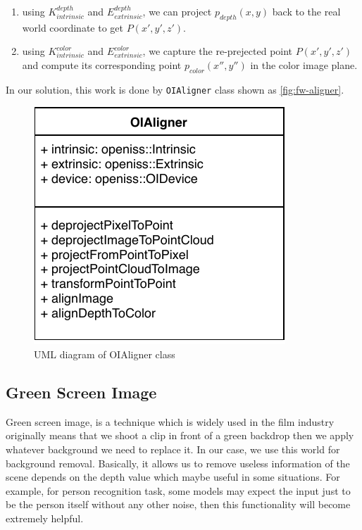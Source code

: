 \begin{enumerate}
    \item using $K_{intrinsic}^{depth}$ and $E_{extrinsic}^{depth}$, we can
    project $p_{depth}(x, y)$ back to the real world coordinate to get
    $P(x', y', z')$.
    \item using $K_{intrinsic}^{color}$ and $E_{extrinsic}^{color}$, we capture
    the re-prejected point $P(x', y', z')$ and compute its corresponding
    point $p_{color}(x'', y'')$ in the color image plane.
\end{enumerate}

In our solution, this work is done by \texttt{OIAligner} class shown as
\autoref{fig:fw-aligner}.

\begin{figure}
    \centering
    \includegraphics[scale=1.0]{figures/framework_oialigner.pdf}
    \caption{UML diagram of OIAligner class}
    \label{fig:fw-aligner}
\end{figure}

\subsection{Green Screen Image}
\label{sec:Impl-fw-app-green-img}

Green screen image, is a technique which is widely used in the film industry
originally means that we shoot a clip in front of a green backdrop then we
apply whatever background we need to replace it.
In our case, we use this world for background removal. Basically, it allows us
to remove useless information of the scene depends on the depth value which
maybe useful in some situations. For example, for person recognition task,
some models may expect the input just to be the person itself without any
other noise, then this functionality will become extremely helpful.

